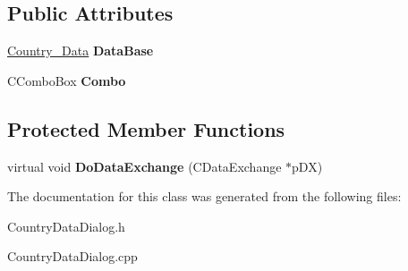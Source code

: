 \subsection*{Public Attributes}
\begin{DoxyCompactItemize}
\item 
\hypertarget{class_country_data_dialog_ab031288bac4638e8d1d1965f61b4fcf9}{}\hyperlink{class_country___data}{Country\+\_\+\+Data} {\bfseries Data\+Base}\label{class_country_data_dialog_ab031288bac4638e8d1d1965f61b4fcf9}

\item 
\hypertarget{class_country_data_dialog_a86e512c68fc0efd0f9220e97ecb28a8b}{}C\+Combo\+Box {\bfseries Combo}\label{class_country_data_dialog_a86e512c68fc0efd0f9220e97ecb28a8b}

\end{DoxyCompactItemize}
\subsection*{Protected Member Functions}
\begin{DoxyCompactItemize}
\item 
\hypertarget{class_country_data_dialog_a0a8b5d4168cc358ebc0762f7e07bda6a}{}virtual void {\bfseries Do\+Data\+Exchange} (C\+Data\+Exchange $\ast$p\+D\+X)\label{class_country_data_dialog_a0a8b5d4168cc358ebc0762f7e07bda6a}

\end{DoxyCompactItemize}


The documentation for this class was generated from the following files\+:\begin{DoxyCompactItemize}
\item 
Country\+Data\+Dialog.\+h\item 
Country\+Data\+Dialog.\+cpp\end{DoxyCompactItemize}
